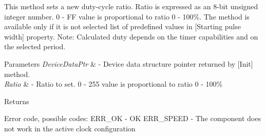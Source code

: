 This method sets a new duty-\/cycle ratio. Ratio is expressed as an 8-\/bit unsigned integer number. 0 -\/ FF value is proportional to ratio 0 -\/ 100\%. The method is available only if it is not selected list of predefined values in \mbox{[}Starting pulse width\mbox{]} property. Note\+: Calculated duty depends on the timer capabilities and on the selected period. 


\begin{DoxyParams}{Parameters}
{\em Device\+Data\+Ptr} & -\/ Device data structure pointer returned by \mbox{[}Init\mbox{]} method. \\
\hline
{\em Ratio} & -\/ Ratio to set. 0 -\/ 255 value is proportional to ratio 0 -\/ 100\% \\
\hline
\end{DoxyParams}
\begin{DoxyReturn}{Returns}

\begin{DoxyItemize}
\item Error code, possible codes\+: E\+R\+R\+\_\+\+OK -\/ OK E\+R\+R\+\_\+\+S\+P\+E\+ED -\/ The component does not work in the active clock configuration 
\end{DoxyItemize}
\end{DoxyReturn}
